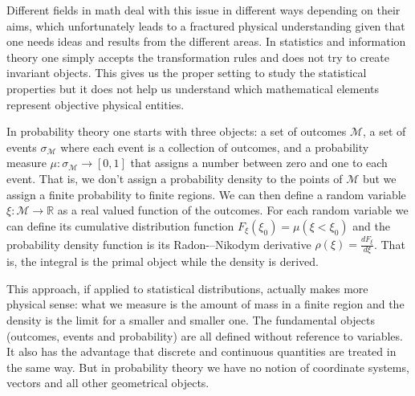 \documentclass[11pt]{article}
\begin{document}
Different fields in math deal with this issue in different ways depending on their aims, which unfortunately leads to a fractured physical understanding given that one needs ideas and results from the different areas. In statistics and information theory one simply accepts the transformation rules and does not try to create invariant objects. This gives us the proper setting to study the statistical properties but it does not help us understand which mathematical elements represent objective physical entities.

In probability theory one starts with three objects: a set of outcomes $\mathcal{M}$, a set of events $\sigma_\mathcal{M}$ where each event is a collection of outcomes, and a probability measure $\mu : \sigma_\mathcal{M} \rightarrow [0,1]$ that assigns a number between zero and one to each event. That is, we don't assign a probability density to the points of $\mathcal{M}$ but we assign a finite probability to finite regions. We can then define a random variable $\xi : \mathcal{M} \rightarrow \mathbb{R}$ as a real valued function of the outcomes. For each random variable we can define its cumulative distribution function $F_\xi(\xi_0)=\mu(\xi<\xi_0)$ and the probability density function is its Radon-–Nikodym derivative $\rho(\xi) = \frac{dF_\xi}{d\xi}$. That is, the integral is the primal object while the density is derived.

This approach, if applied to statistical distributions, actually makes more physical sense: what we measure is the amount of mass in a finite region and the density is the limit for a smaller and smaller one. The fundamental objects (outcomes, events and probability) are all defined without reference to variables. It also has the advantage that discrete and continuous quantities are treated in the same way. But in probability theory we have no notion of coordinate systems, vectors and all other geometrical objects.
\end{document}
